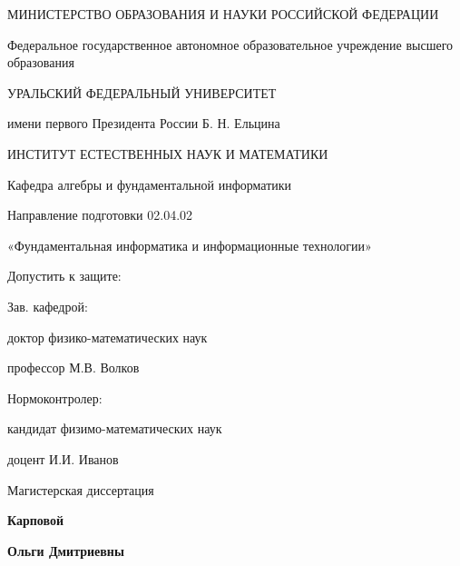 \begin{titlepage}
\centering

МИНИСТЕРСТВО ОБРАЗОВАНИЯ И НАУКИ РОССИЙСКОЙ ФЕДЕРАЦИИ

Федеральное государственное автономное образовательное учреждение высшего образования

УРАЛЬСКИЙ ФЕДЕРАЛЬНЫЙ УНИВЕРСИТЕТ

имени первого Президента России Б. Н. Ельцина
			
\vspace{14pt}

ИНСТИТУТ ЕСТЕСТВЕННЫХ НАУК И МАТЕМАТИКИ
	
\vspace{28pt}

Кафедра алгебры и фундаментальной информатики	

\vspace{28pt}		

\textbf{
    \MakeTextUppercase\@title
}

\vspace{14pt}

Направление подготовки 02.04.02

«Фундаментальная информатика и информационные технологии»

\vspace{28pt}
	
\begin{multicols}{2}	
	\begin{flushleft}
		Допустить к защите:
		
		Зав. кафедрой:
		
		доктор физико-математических наук
		
		профессор М.В. Волков
		
		\underline{\hspace{60mm}}
		
		Нормоконтролер:
		
		кандидат физимо-математических наук
		
		доцент И.И. Иванов
		
		\underline{\hspace{60mm}}
		
	\end{flushleft}	
	\columnbreak	
	\begin{centering}	
		Магистерская диссертация
		
		\textbf{Карповой}
		
		\textbf{Ольги Дмитриевны}
		
		\vspace{14pt}
		

\end{centering}
\end{multicols}
\end{titlepage}
